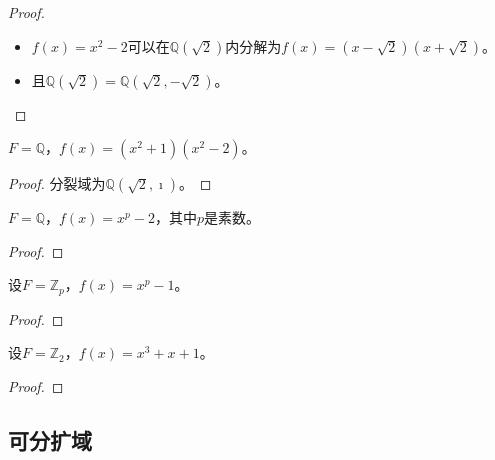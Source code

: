 \begin{proof}
	\begin{itemize}
		\item $f(x)=x^{2}-2$可以在$\mathbb{Q}(\sqrt{2})$内分解为$f(x)=(x-\sqrt{2})(x+\sqrt{2})$。
		\item 且$\mathbb{Q}(\sqrt{2})=\mathbb{Q}(\sqrt{2},-\sqrt{2})$。
	\end{itemize}
\end{proof}

\begin{example}
	$F=\mathbb{Q}$，$f(x)=(x^{2}+1)(x^{2}-2)$。
\end{example}

\begin{proof}
	分裂域为$\mathbb{Q}(\sqrt{2},\imath)$。
\end{proof}

\begin{example}
	$F=\mathbb{Q}$，$f(x)=x^{p}-2$，其中$p$是素数。
\end{example}

\begin{proof}
	
\end{proof}

\begin{example}
	设$F=\mathbb{Z}_{p}$，$f(x)=x^{p}-1$。
\end{example}

\begin{proof}
	
\end{proof}

\begin{example}
	设$F=\mathbb{Z}_{2}$，$f(x)=x^{3}+x+1$。
\end{example}

\begin{proof}
	
\end{proof}

\subsection{可分扩域}

